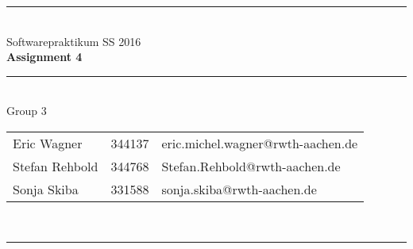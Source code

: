 \documentclass[a4paper,12pt]{article}
\begin{document}
\begin{center}
	\rule{\textwidth}{0.1pt}\\[1cm]
	
	\Large Softwarepraktikum SS 2016\\\bf Assignment 4
\end{center}


\begin{center}

	\rule{\textwidth}{0.1pt}\\[0.5cm]

	{\Large Group 3\\[5mm]} 

	\begin{tabular}{lll}
		
		Eric Wagner & 344137 & eric.michel.wagner@rwth-aachen.de \\

		Stefan Rehbold & 344768 & Stefan.Rehbold@rwth-aachen.de \\

		Sonja Skiba & 331588 & sonja.skiba@rwth-aachen.de \\

	\end{tabular}\\[0.5cm]

	\rule{\textwidth}{0.1pt}\\[1cm]

\end{center}





\end{document}
